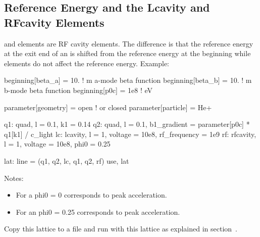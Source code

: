 \documentclass{hitec}
\begin{document}
\subsection{Reference Energy and the Lcavity and RFcavity Elements}


 and   elements are RF cavity elements. The difference is that the reference
 energy at the exit end of an  is shifted from the reference energy at the beginning
 while  elements do not affect the reference energy. Example:
\begin{code}
beginning[beta_a] = 10.   ! m  a-mode beta function
beginning[beta_b] = 10.   ! m  b-mode beta function
beginning[p0c] = 1e8   ! eV  

parameter[geometry] = open      ! or closed
parameter[particle] = He+ 

q1: quad, l = 0.1, k1 = 0.14
q2: quad, l = 0.1, b1_gradient = parameter[p0c] * q1[k1] / c_light
lc: lcavity, l = 1, voltage = 10e8, rf_frequency = 1e9
rf: rfcavity, l = 1, voltage = 10e8, phi0 = 0.25

lat: line = (q1, q2, lc, q1, q2, rf)
use, lat
\end{code}

Notes:
\begin{itemize}
\item For a  phi0 = 0 corresponds to peak acceleration.
\item For an  phi0 = 0.25 corresponds to peak acceleration.
\end{itemize}

Copy this lattice to a file and run \tao with this lattice as explained in
section~.
\end{document}
